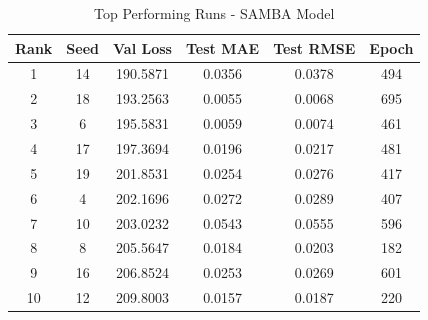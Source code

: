 \begin{table}[ht]
\centering
\caption{Top Performing Runs - SAMBA Model}
\label{tab:samba_results}
\begin{tabular}{cccccc}
\hline
\textbf{Rank} & \textbf{Seed} & \textbf{Val Loss} & \textbf{Test MAE} & \textbf{Test RMSE} & \textbf{Epoch} \\
\hline
1 & 14 & 190.5871 & 0.0356 & 0.0378 & 494 \\
2 & 18 & 193.2563 & 0.0055 & 0.0068 & 695 \\
3 & 6 & 195.5831 & 0.0059 & 0.0074 & 461 \\
4 & 17 & 197.3694 & 0.0196 & 0.0217 & 481 \\
5 & 19 & 201.8531 & 0.0254 & 0.0276 & 417 \\
6 & 4 & 202.1696 & 0.0272 & 0.0289 & 407 \\
7 & 10 & 203.0232 & 0.0543 & 0.0555 & 596 \\
8 & 8 & 205.5647 & 0.0184 & 0.0203 & 182 \\
9 & 16 & 206.8524 & 0.0253 & 0.0269 & 601 \\
10 & 12 & 209.8003 & 0.0157 & 0.0187 & 220 \\
\hline
\end{tabular}
\end{table}
